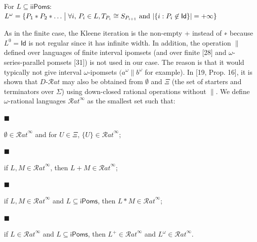 \documentclass[10pt,a4paper]{article}
\begin{document}
For $L\subseteq\mathsf{iiPoms}$: $L^{\omega}={\{P_{1}*P_{2}*\dots\mathrel{\big{|}}\forall i,\,P_{i}\in L,T_{P_{i}}\cong S_{P_{i\text{+}1}}\text{ and }|{\{i:P_{i}\not\in\mathsf{Id}\}}|=+\infty\}}$\par
 
 
  
As in the finite case, the Kleene iteration is the non-empty + instead of ∗ because $L^{0}=\mathsf{Id}$ is not regular since it has infinite width. In addition, the operation $\parallel$ defined over languages of finite interval ipomsets (and over finite [28] and $\omega$-series-parallel pomsets [31]) is not used in our case. The reason is that it would typically not give interval $\omega$-ipomsets $(a^{\omega}\parallel b^{\omega}$ for example). In [19, Prop. 16], it is shown that $D\text{-}\mathcal{R}at$ may also be obtained from $\emptyset$ and $\Xi$ (the set of starters and terminators over $\Sigma$) using down-closed rational operations without $\|$. We define $\omega$-rational languages ${\mathcal{R}at}^{\infty}$ as the smallest set such that:\par
  
\par\noindent  $\blacksquare$ 
 
$\emptyset\in{\mathcal{R}at}^{\infty}$ and for $U\in\Xi$, ${\{U\}}\in{\mathcal{R}at}^{\infty}$;\par
 
 
 
\par\noindent  $\blacksquare$ 
 
if $L,M\in{\mathcal{R}at}^{\infty}$, then $L+M\in{\mathcal{R}at}^{\infty}$;\par
 
 
 
\par\noindent  $\blacksquare$ 
 
if $L,M\in{\mathcal{R}at}^{\infty}$ and $L\subseteq\mathsf{iPoms}$, then $L*M\in{\mathcal{R}at}^{\infty}$;\par
 
 
 
\par\noindent  $\blacksquare$ 
 
if $L\in{\mathcal{R}at}^{\infty}$ and $L\subseteq\mathsf{iPoms}$, then $L^{+}\in{\mathcal{R}at}^{\infty}$ and $L^{\omega}\in{\mathcal{R}at}^{\infty}$.\par
 
\end{document}
